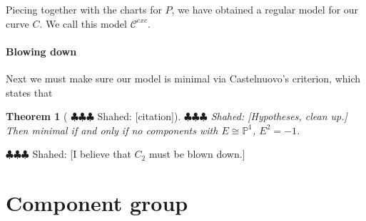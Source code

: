 \documentclass{article}
\newcommand{\shahed}[1]{{\color{Purple} \sf $\clubsuit\clubsuit\clubsuit$ Shahed: [#1]}}
\newcommand{\sce}{\mathscr{C}^{exc}}
\theoremstyle{plain}
\newtheorem{theorem}{Theorem}[section]
\theoremstyle{definition}
\theoremstyle{remark}
\newcommand{\isom}{\cong}
\newcommand{\Pro}{\ensuremath{\mathbb{P}}}
\begin{document}
Piecing together with the charts for $P$, we have obtained a regular model for our curve $C$. We call this model $\sce$.

\paragraph{Blowing down}
\label{sec:blowing-down}

Next we must make sure our model is minimal via Castelnuovo's criterion, which states that
\begin{theorem}[\shahed{citation}]
  \shahed{Hypotheses, clean up.} Then minimal if and only if no components with $E \isom \Pro^1$, $E^2 = -1$.
\end{theorem}

\shahed{I believe that $C_2$ must be blown down.}

\section{Component group}
\label{sec:component-group}




\end{document}
